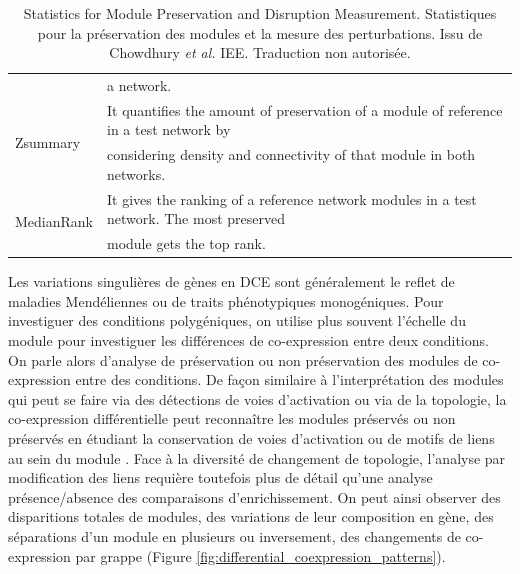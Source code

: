 \begin{table}[h!]
{\begin{tabular}{@{}ll@{}}
                                                                                            & a network.                                                                                          \\
\multirow{2}{*}{Zsummary \cite{Langfelder2011}}                                                         & It quantifies the amount of preservation of a module of reference in a test network by              \\
                                                                                            & considering density and connectivity of that module in both networks.                               \\
\multirow{2}{*}{MedianRank \cite{Langfelder2011}}                                                       & It gives the ranking of a reference network modules in a test network. The most preserved           \\
                                                                                            & module gets the top rank.                                                                           \\ \cmidrule(l){2-2} 
\end{tabular}
}
\caption[Statistiques pour la préservation des modules et la mesure des perturbations]{Statistics for Module Preservation and Disruption Measurement. Statistiques pour la préservation des modules et la mesure des perturbations. Issu de Chowdhury \textit{et al.} \cite{Chowdhury2019}  IEE. Traduction non autorisée.}
\label{table:chowdury_metrics_DCE}
\end{table}

Les variations singulières de gènes en DCE sont généralement le reflet de maladies Mendéliennes ou de traits phénotypiques monogéniques. Pour investiguer des conditions polygéniques, on utilise plus souvent l'échelle du module pour investiguer les différences de co-expression entre deux conditions. On parle alors d'analyse de préservation ou non préservation des modules de co-expression entre des conditions. De façon similaire à l'interprétation des modules qui peut se faire via des détections de voies d'activation ou via de la topologie, la co-expression différentielle peut reconnaître les modules préservés ou non préservés en étudiant la conservation de voies d'activation ou de motifs de liens au sein du module \cite{Chowdhury2019}. Face à la diversité de changement de topologie, l'analyse par modification des liens requière toutefois plus de détail qu'une analyse présence/absence des comparaisons d'enrichissement. On peut ainsi observer des disparitions totales de modules, des variations de leur composition en gène, des séparations d'un module en plusieurs ou inversement, des changements de co-expression par grappe (Figure \ref{fig:differential_coexpression_patterns}).

